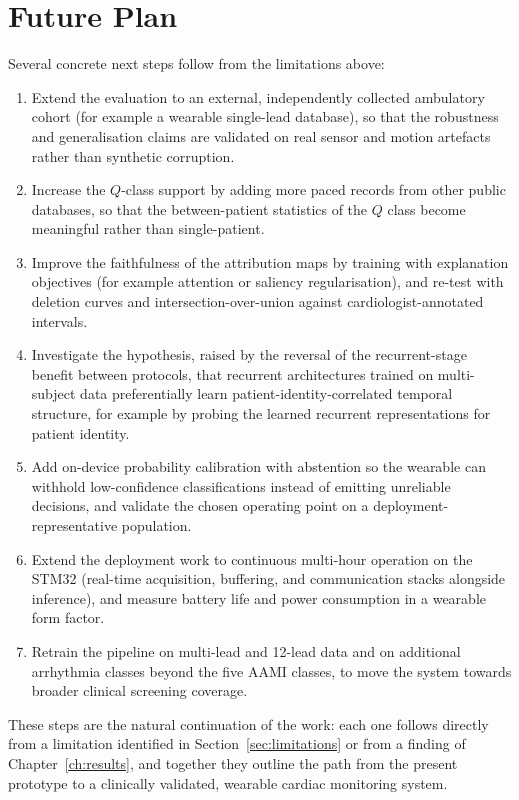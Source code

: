 \section{Future Plan}
\label{sec:future}

Several concrete next steps follow from the limitations above:

\begin{enumerate}
  \item Extend the evaluation to an external, independently collected
        ambulatory cohort (for example a wearable single-lead database), so
        that the robustness and generalisation claims are validated on real
        sensor and motion artefacts rather than synthetic corruption.
  \item Increase the $Q$-class support by adding more paced records from
        other public databases, so that the between-patient statistics of
        the $Q$ class become meaningful rather than single-patient.
  \item Improve the faithfulness of the attribution maps by training with
        explanation objectives (for example attention or saliency
        regularisation), and re-test with deletion curves and
        intersection-over-union against cardiologist-annotated intervals.
  \item Investigate the hypothesis, raised by the reversal of the
        recurrent-stage benefit between protocols, that recurrent
        architectures trained on multi-subject data preferentially learn
        patient-identity-correlated temporal structure, for example by
        probing the learned recurrent representations for patient identity.
  \item Add on-device probability calibration with abstention so the
        wearable can withhold low-confidence classifications instead of
        emitting unreliable decisions, and validate the chosen operating
        point on a deployment-representative population.
  \item Extend the deployment work to continuous multi-hour operation on
        the STM32 (real-time acquisition, buffering, and communication
        stacks alongside inference), and measure battery life and power
        consumption in a wearable form factor.
  \item Retrain the pipeline on multi-lead and 12-lead data and on
        additional arrhythmia classes beyond the five AAMI classes, to move
        the system towards broader clinical screening coverage.
\end{enumerate}

These steps are the natural continuation of the work: each one follows
directly from a limitation identified in Section~\ref{sec:limitations} or
from a finding of Chapter~\ref{ch:results}, and together they outline the
path from the present prototype to a clinically validated, wearable cardiac
monitoring system.